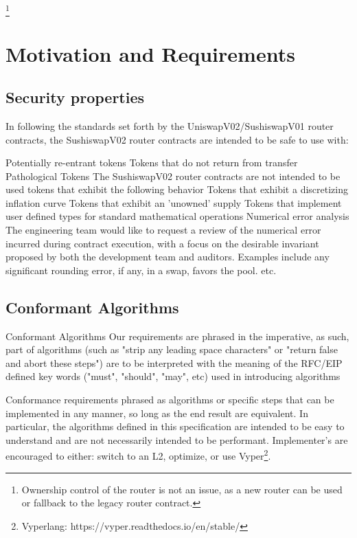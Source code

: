 \documentclass[runningheads]{llncs}
\begin{document}
\footnote{Ownership control of the router is not an issue, as a new router can be used or fallback to the legacy router contract.}


\newpage
\section{Motivation and Requirements}

\subsection{Security properties}

In following the standards set forth by the UniswapV02/SushiswapV01 router contracts, the SushiswapV02 router contracts are intended to be safe to use with:

Potentially re-entrant tokens
Tokens that do not return from transfer
Pathological Tokens The SushiswapV02 router contracts are not intended to be used tokens that exhibit the following behavior
Tokens that exhibit a discretizing inflation curve
Tokens that exhibit an 'unowned' supply
Tokens that implement user defined types for standard mathematical operations
Numerical error analysis The engineering team would like to request a review of the numerical error incurred during contract execution, with a focus on the desirable invariant proposed by both the development team and auditors. Examples include any significant rounding error, if any, in a swap, favors the pool. etc.


\subsection{Conformant Algorithms}

Conformant Algorithms
Our requirements are phrased in the imperative, as such, part of algorithms (such as "strip any leading space characters" or "return false and abort these steps") are to be interpreted with the meaning of the RFC/EIP defined key words ("must", "should", "may", etc) used in introducing algorithms

\hfill \break

Conformance requirements phrased as algorithms or specific steps that can be implemented in any manner, so long as the end result are equivalent. In particular, the algorithms defined in this specification are intended to be easy to understand and are not necessarily intended to be performant. Implementer's are encouraged to either: switch to an L2, optimize, or use Vyper\footnote{Vyperlang: https://vyper.readthedocs.io/en/stable/}.
\end{document}
